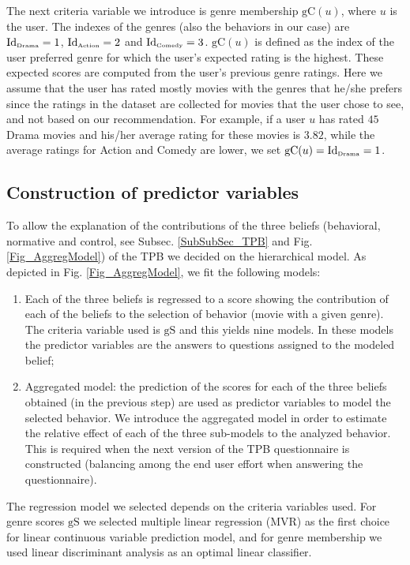 \documentclass{llncs}
\def\gS{{\mbox{gS}}}
\def\gC{{\mbox{gC}}}
\def\Id{{\mbox{Id}}}
\begin{document}
The next criteria variable we introduce is genre membership $\gC(u)$, where $u$ is the user. The indexes of the genres (also the behaviors in our case) are $\Id_{\mbox{\tiny Drama}}=1$, $\Id_{\mbox{\tiny Action}}=2$ and $\Id_{\mbox{\tiny Comedy}}=3$. $\gC(u)$ is defined as the index of the user preferred genre for which the user's expected rating is the highest. These expected scores are computed from the user's previous genre ratings. Here we assume that the user has rated mostly movies with the genres that he/she prefers since the ratings in the dataset are collected for movies that the user chose to see, and not based on our recommendation.  For example, if a user $u$ has rated $45$ Drama movies and his/her average rating for these movies is $3.82$, while the average ratings for Action and Comedy are lower, we set $\gC(u)=\Id_{\mbox{\tiny Drama}}=1$.
 
\subsection{Construction of predictor variables}\label{SubSec_PredVarConstr} 

To allow the explanation of the contributions of the three beliefs (behavioral, normative and control, see Subsec.  \ref{SubSubSec_TPB} and Fig. \ref{Fig_AggregModel}) of the TPB we decided on the hierarchical model. As depicted in Fig. \ref{Fig_AggregModel}, we fit the following models:  
\begin{enumerate}
 \item Each of the three beliefs is regressed to a score showing the contribution of each of the beliefs to the selection of behavior (movie with a given genre). The criteria variable used is $\gS$ and this yields nine models. In these models the predictor variables are the answers to questions assigned to the modeled belief; 
 \item Aggregated model: the prediction of the scores for each of the three beliefs obtained (in the previous step) are used as predictor variables to model the selected behavior. We introduce the aggregated model in order to estimate the relative effect of each of the three sub-models to the analyzed behavior. This is required when the next version of the TPB questionnaire is constructed (balancing among the end user effort when answering the questionnaire).
\end{enumerate}
The regression model we selected depends on the criteria variables used. For genre scores $\gS$ we selected multiple linear regression (MVR) as the first choice for linear continuous variable prediction model, and for genre membership we used linear discriminant analysis as an optimal linear classifier.
 
\end{document}
